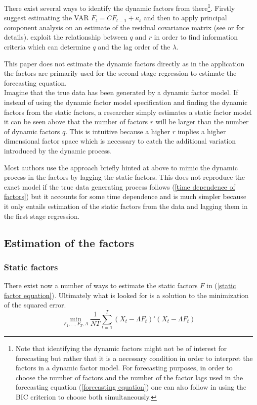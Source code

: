 \documentclass[12pt]{article}
\begin{document}
There exist several ways to identify the dynamic factors from there\footnote{Note that identifying the dynamic factors might not be of interest for forecasting but rather that it is a necessary condition in order to interpret the factors in a dynamic factor model. For forecasting purposes, in order to choose the number of factors and the number of the factor lags used in the forecasting equation (\ref{forecasting equation}) one can also follow \citet{bai2008forecasting} in using the BIC criterion to choose both simultaneously. }. Firstly \citet{giannone2002tracking} suggest estimating the VAR $F_t = C F_{t-1} + \kappa_t$ and then to apply principal component analysis on an estimate of the residual covariance matrix (see \citet{breitung2004identification} or \citet{giannone2002tracking} for details). \citet{breitung2004identification} exploit the relationship between $q$ and $r$ in order to find information criteria which can determine $q$ and the lag order of the $\lambda$. 

This paper does not estimate the dynamic factors directly as in the application the factors are primarily used for the second stage regression to estimate the forecasting equation. \\

Imagine that the true data has been generated by a dynamic factor model. If instead of using the dynamic factor model specification and finding the dynamic factors from the static factors, a researcher simply estimates a static factor model it can be seen above that the number of factors $r$ will be larger than the number of dynamic factors $q$. This is intuitive because a higher $r$ implies a higher dimensional factor space which is necessary to catch the additional variation introduced by the dynamic process.

Most authors use the approach briefly hinted at above to mimic the dynamic process in the factors by lagging the static factors. This does not reproduce the exact model if the true data generating process follows (\ref{time dependence of factors}) but it accounts for some time dependence and is much simpler because it only entails estimation of the static factors from the data and lagging them in the first stage regression.

\subsection{Estimation of the factors}
\subsubsection{Static factors}
There exist now a number of ways to estimate the static factors $F$ in (\ref{static factor equation}). Ultimately what is looked for is a solution to the minimization of the squared error.
\begin{equation}
	\label{factor equation minimization problem}
	\min_{F_1, ..., F_T, \Lambda} \frac{1}{NT} \sum_{t=1}^T (X_t - \Lambda F_t)'(X_t - \Lambda F_t)
\end{equation}
\end{document}
